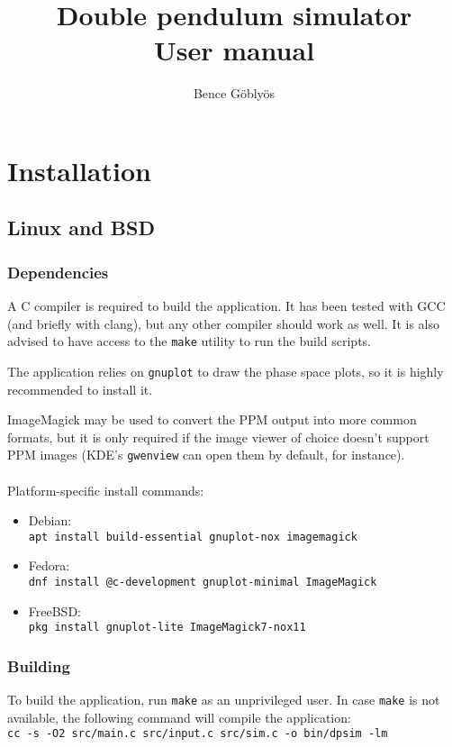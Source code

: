 \documentclass[a4paper,12pt]{article}
\title{Double pendulum simulator\\User manual}
\author{Bence Göblyös}
\begin{document}
\maketitle
\newpage
{}

\section{Installation}

\subsection{Linux and BSD}

\subsubsection{Dependencies}
A C compiler is required to build the application.
It has been tested with GCC (and briefly with clang),
but any other compiler should work as well.
It is also advised to have access to the \texttt{make} utility to run the build scripts.

The application relies on \texttt{gnuplot} to draw the phase space plots,
so it is highly recommended to install it.

ImageMagick may be used to convert the PPM output into more common formats,
but it is only required if the image viewer of choice doesn't support PPM images
(KDE's \texttt{gwenview} can open them by default, for instance).\\\\
Platform-specific install commands:
\begin{itemize}
 \item Debian:\\ \texttt{apt install build-essential gnuplot-nox imagemagick}
 \item Fedora:\\ \texttt{dnf install @c-development gnuplot-minimal ImageMagick}
 \item FreeBSD:\\ \texttt{pkg install gnuplot-lite ImageMagick7-nox11}
\end{itemize}

\subsubsection{Building}

To build the application, run \texttt{make} as an unprivileged user.
In case \texttt{make} is not available,
the following command will compile the application:\\
\texttt{cc -s -O2 src/main.c src/input.c src/sim.c -o bin/dpsim -lm}
\end{document}
